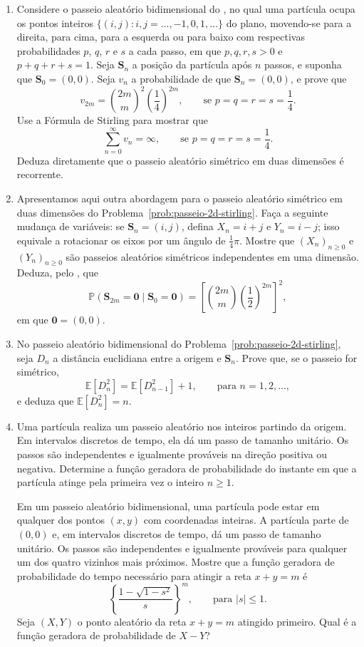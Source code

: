 \documentclass[12pt,portuguese]{article}
\theoremstyle{definition}
\theoremstyle{plainexercise}
\theoremstyle{starredexercise}
\theoremstyle{definition}
\begin{document}
\begin{enumerate}[label={\arabic*.}]
\item\label{prob:passeio-2d-stirling}
Considere o passeio aleatório bidimensional do , no
qual uma partícula ocupa os pontos inteiros
$\{(i,j):i,j=\ldots,-1,0,1,\ldots\}$ do plano, movendo-se para a direita, para
cima, para a esquerda ou para baixo com respectivas probabilidades $p$, $q$, $r$
e $s$ a cada passo, em que $p,q,r,s>0$ e $p+q+r+s=1$. Seja $\mathbf{S}_n$ a
posição da partícula após $n$ passos, e suponha que $\mathbf{S}_0=(0,0)$. Seja
$v_n$ a probabilidade de que $\mathbf{S}_n=(0,0)$, e prove que
\[
v_{2m}=\binom{2m}{m}^2\left(\frac{1}{4}\right)^{2m},
\qquad\text{se } p=q=r=s=\frac{1}{4}.
\]
Use a Fórmula de Stirling para mostrar que
\[
\sum_{n=0}^{\infty}v_n=\infty,
\qquad\text{se } p=q=r=s=\frac{1}{4}.
\]
Deduza diretamente que o passeio aleatório simétrico em duas dimensões é
recorrente.

\item\label{prob:passeio-2d-rotacao}
Apresentamos aqui outra abordagem para o passeio aleatório simétrico em duas
dimensões do Problema~\ref{prob:passeio-2d-stirling}. Faça a seguinte mudança
de variáveis: se $\mathbf{S}_n=(i,j)$, defina $X_n=i+j$ e $Y_n=i-j$; isso
equivale a rotacionar os eixos por um ângulo de $\tfrac{1}{4}\pi$. Mostre que
$(X_n)_{n \geqslant 0}$ e $(Y_n)_{n \geqslant 0}$ são passeios aleatórios simétricos
independentes em uma dimensão. Deduza, pelo , que
\[
\mathbb{P}(\mathbf{S}_{2m}=\mathbf{0}\mid\mathbf{S}_0=\mathbf{0})
=\left[\binom{2m}{m}\left(\frac{1}{2}\right)^{2m}\right]^2,
\]
em que $\mathbf{0}=(0,0)$.

\item\label{prob:passeio-2d-distancia}
No passeio aleatório bidimensional do Problema~\ref{prob:passeio-2d-stirling},
seja $D_n$ a distância euclidiana entre a origem e $\mathbf{S}_n$. Prove que,
se o passeio for simétrico,
\[
\mathbb{E}[D_n^2]=\mathbb{E}[D_{n-1}^2]+1, \qquad\text{para } n=1,2,\ldots,
\]
e deduza que $\mathbb{E}[D_n^2]=n$.

\item[\starredproblem]\label{prob:tempo-atingimento-1d-2d}
Uma partícula realiza um passeio aleatório nos inteiros partindo da origem. Em
intervalos discretos de tempo, ela dá um passo de tamanho unitário. Os passos
são independentes e igualmente prováveis na direção positiva ou negativa.
Determine a função geradora de probabilidade do instante em que a partícula
atinge pela primeira vez o inteiro $n\geqslant 1$.

Em um passeio aleatório bidimensional, uma partícula pode estar em qualquer dos
pontos $(x,y)$ com coordenadas inteiras. A partícula parte de $(0,0)$ e, em
intervalos discretos de tempo, dá um passo de tamanho unitário. Os passos são
independentes e igualmente prováveis para qualquer um dos quatro vizinhos mais
próximos. Mostre que a função geradora de probabilidade do tempo necessário
para atingir a reta $x+y=m$ é
\[
\left\{\frac{1-\sqrt{1-s^2}}{s}\right\}^m,
\qquad\text{para } |s|\leqslant 1.
\]
Seja $(X,Y)$ o ponto aleatório da reta $x+y=m$ atingido primeiro. Qual é a
função geradora de probabilidade de $X-Y$?


\end{enumerate}
\end{document}
